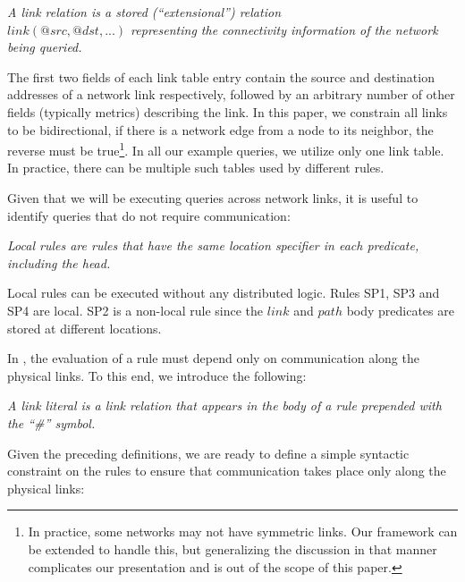 \begin{Def}{\em A {\em link relation} is a stored (``extensional'')
     relation \\$link(@src, @dst, ...)$ representing the connectivity
     information of the network being queried.}\end{Def}

The first two fields of each link table entry contain the source and
destination addresses of a network link respectively, followed by an
arbitrary number of other fields (typically metrics) describing the
link.  In this paper, we constrain all links to be
bidirectional, \ie if there is
a network edge from a node to its neighbor, the reverse must be true\footnote{In practice, some networks may not have
symmetric links.  Our framework can be extended to handle this, but
generalizing the discussion in that manner complicates our
presentation and is out of the scope of this paper.}.
In all our example queries, we utilize only one link table. In
practice, there can be multiple such tables used by different rules.

Given that we will be executing queries across network links, it is useful to identify queries that do not require communication:
\begin{Def}{\em {\em Local rules} are rules that have the same
	location specifier in each predicate, including the
	head.}\end{Def}


Local rules can be executed without any distributed logic.  Rules SP1,
  SP3 and SP4 are local. SP2 is a non-local rule since the
  $link$ and $path$ body predicates are stored at different
  locations. 

In \Dlog, the evaluation of a rule must depend only on communication
along the physical links. To this end, we introduce the following:
\begin{Def}{\em A {\em link literal} is a link relation that appears
in the body of a rule prepended with the ``\#'' symbol.}
\end{Def}
Given the preceding definitions, we are ready to define a simple
syntactic constraint on the rules to ensure that communication takes
place only along the physical links:

